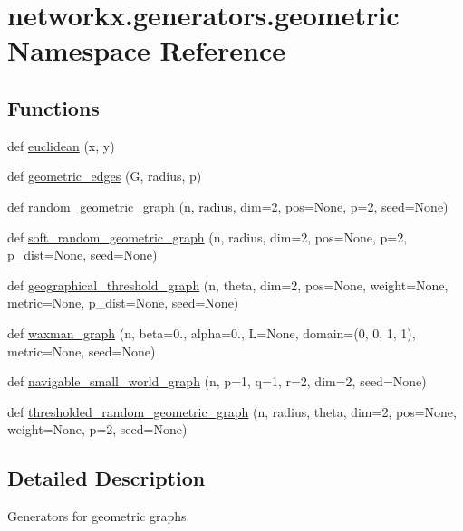 \hypertarget{namespacenetworkx_1_1generators_1_1geometric}{}\section{networkx.\+generators.\+geometric Namespace Reference}
\label{namespacenetworkx_1_1generators_1_1geometric}
\subsection*{Functions}
\begin{DoxyCompactItemize}
\item 
def \hyperlink{namespacenetworkx_1_1generators_1_1geometric_af251647619091b18e2f1042d974e6b29}{euclidean} (x, y)
\item 
def \hyperlink{namespacenetworkx_1_1generators_1_1geometric_a4ca2553d54d1f2aeb54c71aa8d98e05f}{geometric\+\_\+edges} (G, radius, p)
\item 
def \hyperlink{namespacenetworkx_1_1generators_1_1geometric_aa0380de561153f3a41d8ea691df02370}{random\+\_\+geometric\+\_\+graph} (n, radius, dim=2, pos=None, p=2, seed=None)
\item 
def \hyperlink{namespacenetworkx_1_1generators_1_1geometric_a9f8a8e869f0ada3f64fabf3d53129d21}{soft\+\_\+random\+\_\+geometric\+\_\+graph} (n, radius, dim=2, pos=None, p=2, p\+\_\+dist=None, seed=None)
\item 
def \hyperlink{namespacenetworkx_1_1generators_1_1geometric_ab0b2aa9a0067889b2dee22782d49ab28}{geographical\+\_\+threshold\+\_\+graph} (n, theta, dim=2, pos=None, weight=None, metric=None, p\+\_\+dist=None, seed=None)
\item 
def \hyperlink{namespacenetworkx_1_1generators_1_1geometric_a9714b30e53e8104685d8b550db52e705}{waxman\+\_\+graph} (n, beta=0., alpha=0., L=None, domain=(0, 0, 1, 1), metric=None, seed=None)
\item 
def \hyperlink{namespacenetworkx_1_1generators_1_1geometric_ac23a02dfb8c6fd5f1ec50680c7f7a59e}{navigable\+\_\+small\+\_\+world\+\_\+graph} (n, p=1, q=1, r=2, dim=2, seed=None)
\item 
def \hyperlink{namespacenetworkx_1_1generators_1_1geometric_a1924e6b8a54833447193d3ebdc2e81c4}{thresholded\+\_\+random\+\_\+geometric\+\_\+graph} (n, radius, theta, dim=2, pos=None, weight=None, p=2, seed=None)
\end{DoxyCompactItemize}


\subsection{Detailed Description}
\begin{DoxyVerb}Generators for geometric graphs.
\end{DoxyVerb}
 

